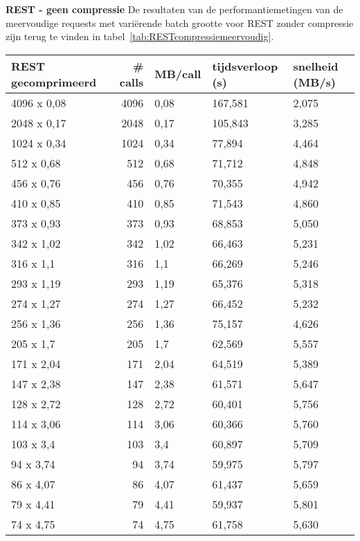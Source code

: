 \textbf{REST - geen compressie}\newline
De resultaten van de performantiemetingen van de meervoudige requests met vari\"erende batch grootte voor REST zonder compressie zijn terug te vinden in tabel~\ref{tab:RESTcompressiemeervoudig}.

\begin{table}
    \centering
    \begin{tabular}{lrlll}
        \toprule
        \textbf{REST gecomprimeerd} & \textbf{\# calls} & \textbf{MB/call} & \textbf{tijdsverloop (s)} & \textbf{snelheid (MB/s)} \\
        \midrule
        4096 x 0,08 & 4096 & 0,08 & 167,581 & 2,075 \\
        2048 x 0,17 & 2048 & 0,17 & 105,843 & 3,285 \\
        1024 x 0,34 & 1024 & 0,34 & 77,894 & 4,464 \\
        512 x 0,68 & 512 & 0,68 & 71,712 & 4,848 \\
        456 x 0,76 & 456 & 0,76 & 70,355 & 4,942 \\
        410 x 0,85 & 410 & 0,85 & 71,543 & 4,860 \\
        373 x 0,93 & 373 & 0,93 & 68,853 & 5,050 \\
        342 x 1,02 & 342 & 1,02 & 66,463 & 5,231 \\
        316 x 1,1 & 316 & 1,1 & 66,269 & 5,246 \\
        293 x 1,19 & 293 & 1,19 & 65,376 & 5,318 \\
        274 x 1,27 & 274 & 1,27 & 66,452 & 5,232 \\
        256 x 1,36 & 256 & 1,36 & 75,157 & 4,626 \\
        205 x 1,7 & 205 & 1,7 & 62,569 & 5,557 \\
        171 x 2,04 & 171 & 2,04 & 64,519 & 5,389 \\
        147 x 2,38 & 147 & 2,38 & 61,571 & 5,647 \\
        128 x 2,72 & 128 & 2,72 & 60,401 & 5,756 \\
        114 x 3,06 & 114 & 3,06 & 60,366 & 5,760 \\
        103 x 3,4 & 103 & 3,4 & 60,897 & 5,709 \\
        94 x 3,74 & 94 & 3,74 & 59,975 & 5,797 \\
        86 x 4,07 & 86 & 4,07 & 61,437 & 5,659 \\
        79 x 4,41 & 79 & 4,41 & 59,937 & 5,801 \\
        74 x 4,75 & 74 & 4,75 & 61,758 & 5,630 \\

\end{tabular}
\end{table}
